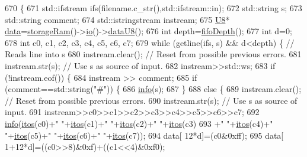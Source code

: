 \begin{DoxyCode}
670                                         \{
671   std::ifstream ifs(filename.c\_str(),std::ifstream::in);
672   std::string s;
673   std::string comment;
674   std::istringstream instream;
675   \hyperlink{ICECALv3_8h_a3cb25ca6f51f003950f9625ff05536fc}{U8}* \hyperlink{namespaceshell_a5ea2525995cedc3efd69ea8a7f034d1e}{data}=\hyperlink{classA3PE_af241373059bad4a3c376ab2ac98a7b29}{storageRam}()->\hyperlink{classIOobject_af04fb94137c3d86849f478ac5afab5d1}{io}()->\hyperlink{classIOdata_a75e9c318dbac3a39402179070943d4bc}{dataU8}();
676   \textcolor{keywordtype}{int} depth=\hyperlink{classA3PE_a8bb523e4a7a5dbb6ab3c5549ebf6db86}{fifoDepth}();
677   \textcolor{keywordtype}{int} d=0;
678   \textcolor{keywordtype}{int} c0, c1, c2, c3, c4, c5, c6, c7;
679   \textcolor{keywordflow}{while} (getline(ifs, s) && d<depth) \{ \textcolor{comment}{// Reads line into s}
680       instream.clear();     \textcolor{comment}{// Reset from possible previous errors.}
681       instream.str(s);      \textcolor{comment}{// Use s as source of input.}
682       instream>>std::ws;
683       \textcolor{keywordflow}{if} (!instream.eof()) \{
684         instream >> comment;
685         \textcolor{keywordflow}{if} (comment==std::string(\textcolor{stringliteral}{"#"})) \{
686           \hyperlink{classObject_a644fd329ea4cb85f54fa6846484b84a8}{info}(s);
687         \}
688         \textcolor{keywordflow}{else} \{
689           instream.clear();     \textcolor{comment}{// Reset from possible previous errors.}
690           instream.str(s);      \textcolor{comment}{// Use s as source of input.}
691           instream>>c0>>c1>>c2>>c3>>c4>>c5>>c6>>c7;
692           \hyperlink{classObject_a644fd329ea4cb85f54fa6846484b84a8}{info}(\hyperlink{Tools_8h_af330027dbdafb9a30768b3613c553e60}{itos}(c0)+\textcolor{stringliteral}{" "}+\hyperlink{Tools_8h_af330027dbdafb9a30768b3613c553e60}{itos}(c1)+\textcolor{stringliteral}{" "}+\hyperlink{Tools_8h_af330027dbdafb9a30768b3613c553e60}{itos}(c2)+\textcolor{stringliteral}{" "}+\hyperlink{Tools_8h_af330027dbdafb9a30768b3613c553e60}{itos}(c3)
693               +\textcolor{stringliteral}{" "}+\hyperlink{Tools_8h_af330027dbdafb9a30768b3613c553e60}{itos}(c4)+\textcolor{stringliteral}{" "}+\hyperlink{Tools_8h_af330027dbdafb9a30768b3613c553e60}{itos}(c5)+\textcolor{stringliteral}{" "}+\hyperlink{Tools_8h_af330027dbdafb9a30768b3613c553e60}{itos}(c6)+\textcolor{stringliteral}{" "}+\hyperlink{Tools_8h_af330027dbdafb9a30768b3613c553e60}{itos}(c7));
694           data[   12*d]=(c0&0xff);
695           data[ 1+12*d]=((c0>>8)&0xf)+((c1<<4)&0xf0);

\end{DoxyCode}
